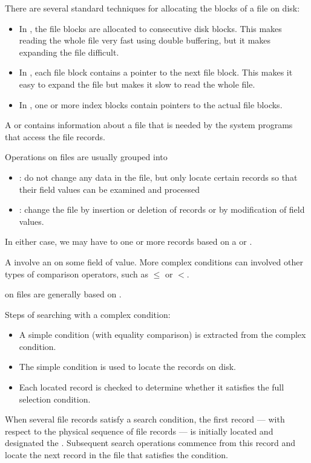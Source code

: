     \par There are several standard techniques for allocating the blocks of a file on disk:
    \begin{itemize}
      \item In , the file blocks are allocated to consecutive disk blocks. This makes reading the whole file very fast using double buffering, but it makes expanding the file difficult.
      \item In , each file block contains a pointer to the next file block. This makes it easy to expand the file but makes it slow to read the whole file.
      \item In , one or more index blocks contain pointers to the actual file blocks.
    \end{itemize}

    \par A  or  contains information about a file that is needed by the system programs that access the file records.


  \par Operations on files are usually grouped into
    \begin{itemize}
      \item {}: do not change any data in the file, but only locate certain records so that their field values can be examined and processed
      \item {}: change the file by insertion or deletion of records or by modification of field values.
    \end{itemize}
  \par In either case, we may have to  one or more records based on a  or .
  \par A  involve an  on some field of value. More complex conditions can involved other types of comparison operators, such as $\leq$ or $<$.
  \par {} on files are generally based on .
  \par Steps of searching with a complex condition:
    \begin{itemize}
      \item A simple condition (with equality comparison) is extracted from the complex condition.
      \item The simple condition is used to locate the records on disk.
      \item Each located record is checked to determine whether it satisfies the full selection condition.
    \end{itemize}
  \par When several file records satisfy a search condition, the first record — with respect to the physical sequence of file records — is initially located and designated the . Subsequent search operations commence from this record and locate the next record in the file that satisfies the condition.

